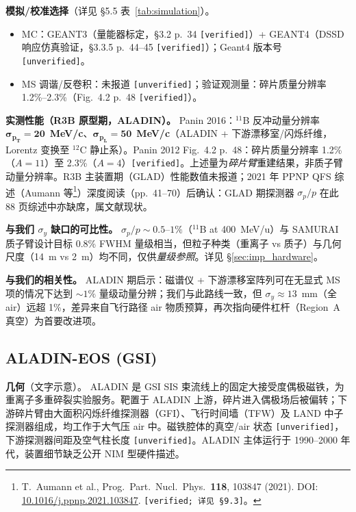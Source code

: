 \documentclass[a4paper, 11pt]{article}
\begin{document}
\textbf{模拟/校准选择}（详见 §5.5 表~\ref{tab:simulation}）。
\begin{itemize}[leftmargin=2em,itemsep=0pt]
\item MC：GEANT3（量能器标定，§3.2 p.~34 \texttt{[verified]}）+ GEANT4（DSSD 响应仿真验证，§3.3.5 p.~44--45 \texttt{[verified]}）；Geant4 版本号 \texttt{[unverified]}。
\item MS 调谐/反卷积：未报道 \texttt{[unverified]}；验证观测量：碎片质量分辨率 1.2\%--2.3\%（Fig.~4.2 p.~48 \texttt{[verified]}）。
\end{itemize}

\textbf{实测性能（R3B 原型期，ALADIN）。}
Panin 2016：$^{11}$B 反冲动量分辨率 $\boldsymbol{\sigma_{p_T} = 20}$~\textbf{MeV/c}、$\boldsymbol{\sigma_{p_L} = 50}$~\textbf{MeV/c}（ALADIN + 下游漂移室/闪烁纤维，Lorentz 变换至 $^{12}$C 静止系）。Panin 2012 Fig.~4.2 p.~48：碎片质量分辨率 1.2\%（$A=11$）至 2.3\%（$A=4$）\texttt{[verified]}。上述量为\emph{碎片臂}重建结果，非质子臂动量分辨率。R3B 主装置期（GLAD）性能数值未报道；2021 年 PPNP QFS 综述（Aumann 等\footnote{\label{fn:aumann2021ppnp}T.~Aumann et al., Prog.\ Part.\ Nucl.\ Phys.\ \textbf{118}, 103847 (2021). DOI: \href{https://doi.org/10.1016/j.ppnp.2021.103847}{10.1016/j.ppnp.2021.103847}. \texttt{[verified; 详见 §9.3]}。}）深度阅读（pp.~41--70）后确认：GLAD 期探测器 $\sigma_p/p$ 在此 88 页综述中亦缺席，属文献现状。

\textbf{与我们 $\sigma_y$ 缺口的可比性。}
$\sigma_p/p \sim 0.5$--$1\%$（$^{11}$B at 400~MeV/u）与 SAMURAI 质子臂设计目标 0.8\% FWHM 量级相当，但粒子种类（重离子 vs 质子）与几何尺度（14~m vs 2~m）均不同，仅供\emph{量级参照}。详见 §\ref{sec:imp_hardware}。

\textbf{与我们的相关性。}
ALADIN 期启示：磁谱仪 + 下游漂移室阵列可在无显式 MS 项的情况下达到 $\sim 1\%$ 量级动量分辨；我们与此路线一致，但 $\sigma_y \approx 13$~mm（全 air）远超 1\%，差异来自飞行路径 air 物质预算，再次指向硬件杠杆（Region~A 真空）为首要改进项。

\subsection{ALADIN-EOS (GSI)}
\label{sec:card_aladin}

\textbf{几何}（文字示意）。
ALADIN 是 GSI SIS 束流线上的固定大接受度偶极磁铁，为重离子多重碎裂实验服务。靶置于 ALADIN 上游，碎片进入偶极场后被偏转；下游碎片臂由大面积闪烁纤维探测器（GFI）、飞行时间墙（TFW）及 LAND 中子探测器组成，均工作于大气压 air 中。磁铁腔体的真空/air 状态 \texttt{[unverified]}，下游探测器间距及空气柱长度 \texttt{[unverified]}。ALADIN 主体运行于 1990--2000 年代，装置细节缺乏公开 NIM 型硬件描述。
\end{document}
